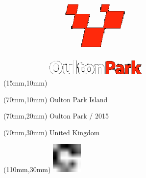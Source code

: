 \null\newpage
\begin{textblock*}{50mm}(15mm,10mm)%
\includegraphics[width=50mm]{LG/OUL.png}
\end{textblock*}
\begin{textblock*}{130mm}(70mm,10mm)%
{\fontsize{20}{20}\selectfont Oulton Park Island}\\
\end{textblock*}
\begin{textblock*}{120mm}(70mm,20mm)%
{\fontsize{16}{16}\selectfont Oulton Park / 2015}\\
\end{textblock*}
\begin{textblock*}{120mm}(70mm,30mm)%
{\fontsize{12}{12}\selectfont United Kingdom}
\end{textblock*}
\begin{textblock*}{30mm}(110mm,30mm)%
\centering
\includegraphics[height=15mm]{icons/fa-rotate-right.pdf}
\end{textblock*}

